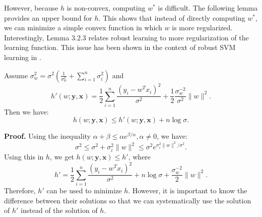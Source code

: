 	However, because $h$ is non-convex, computing $w^*$ is difficult. The following lemma provides an upper bound for $h$. This shows that instead of directly computing $w^*$, we can minimize a simple convex function in which $w$ is more regularized. Interestingly, Lemma 3.2.3 relates robust learning to more regularization of the learning function. This issue has been shown in the context of robust SVM learning in \cite{xu2007regularization}.
	
	\begin{lemma}
		Assume $\sigma_w^2 = \sigma^2( \frac{1}{\sigma_w^2} + \sum_{i=1}^{n} \sigma_i^2 )$ and
		\begin{equation}
			h'(w; \mathbf{y}, \mathbf{x}) = \frac{1}{2} \sum_{i=1}^{n} \frac{(y_i - w^T x_i)^2}{\sigma^2} + \frac{1}{2} \frac{\sigma_w^{-2}}{\sigma^2} \|w\|^2.
		\end{equation}
		Then we have:
		\begin{equation}
			h(w; \mathbf{y}, \mathbf{x}) \le h'(w; \mathbf{y}, \mathbf{x}) + n \log \sigma.
		\end{equation}
	\end{lemma}
	
	\textbf{Proof.} Using the inequality $\alpha + \beta \le \alpha e^{\beta/\alpha}, \alpha \neq 0$, we have:
	\begin{equation}
		\sigma^2 \le \sigma^2 + \sigma_i^2 \|w\|^2 \le \sigma^2 e^{\sigma_i^2 \|w\|^2 / \sigma^2}.
	\end{equation}
	Using this in $h$, we get $h(w; \mathbf{y}, \mathbf{x}) \le h'$, where
	\begin{equation}
		h' = \frac{1}{2} \sum_{i=1}^{n} \frac{(y_i - w^T x_i)^2}{\sigma^2} + n \log \sigma + \frac{\sigma_w^{-2}}{2} \|w\|^2.
	\end{equation}
	Therefore, $h'$ can be used to minimize $h$. However, it is important to know the difference between their solutions so that we can systematically use the solution of $h'$ instead of the solution of $h$.
	
